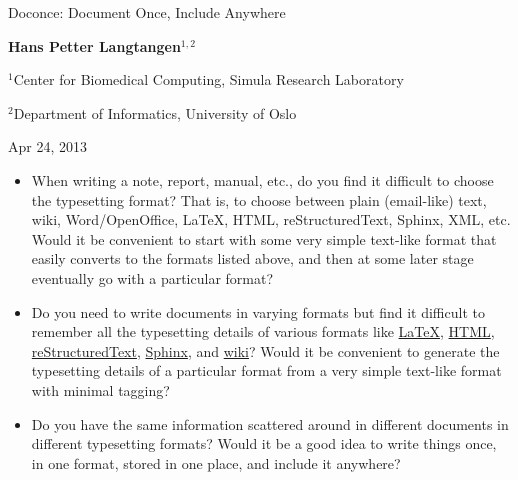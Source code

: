 \documentclass[%
oneside,                 %
final,                   %
10pt]{article}
\begin{document}





\begin{center}
{\LARGE\bf
\begin{spacing}{1.25}
Doconce: Document Once, Include Anywhere
\end{spacing}
}
\end{center}



\begin{center}
{\bf Hans Petter Langtangen${}^{1, 2}$} \\ [0mm]
\end{center}

\begin{center}
\centerline{{\small ${}^1$Center for Biomedical Computing, Simula Research Laboratory}}
\centerline{{\small ${}^2$Department of Informatics, University of Oslo}}
\end{center}




\begin{center}
Apr 24, 2013
\end{center}

\vspace{1cm}



\begin{itemize}
 \item When writing a note, report, manual, etc., do you find it difficult
   to choose the typesetting format? That is, to choose between plain
   (email-like) text, wiki, Word/OpenOffice, {\LaTeX}, HTML,
   reStructuredText, Sphinx, XML, etc.  Would it be convenient to
   start with some very simple text-like format that easily converts
   to the formats listed above, and then at some later stage
   eventually go with a particular format?

 \item Do you need to write documents in varying formats but find it
   difficult to remember all the typesetting details of various
   formats like \href{{http://refcards.com/docs/silvermanj/amslatex/LaTeXRefCard.v2.0.pdf}}{LaTeX}, \href{{http://www.htmlcodetutorial.com/}}{HTML}, \href{{http://docutils.sourceforge.net/docs/ref/rst/restructuredtext.html}}{reStructuredText}, \href{{http://sphinx.pocoo.org/contents.html}}{Sphinx}, and \href{{http://code.google.com/p/support/wiki/WikiSyntax}}{wiki}? Would it be convenient
   to generate the typesetting details of a particular format from a
   very simple text-like format with minimal tagging?

 \item Do you have the same information scattered around in different
   documents in different typesetting formats? Would it be a good idea
   to write things once, in one format, stored in one place, and
   include it anywhere?
\end{itemize}
\end{document}
